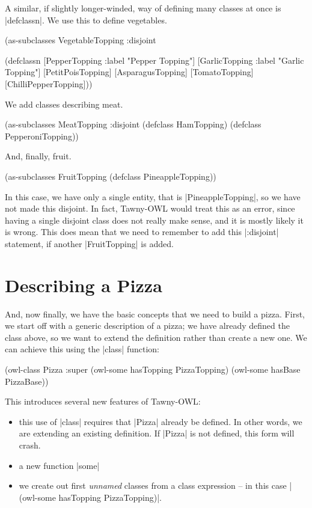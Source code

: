 A similar, if slightly longer-winded, way of defining many classes at
once is |defclassn|. We use this to define vegetables.

\begin{tawny}
(as-subclasses
 VegetableTopping
 :disjoint

 (defclassn
  [PepperTopping
    :label "Pepper Topping"]
  [GarlicTopping
    :label "Garlic Topping"]
  [PetitPoisTopping]
  [AsparagusTopping]
  [TomatoTopping]
  [ChilliPepperTopping]))
\end{tawny}

We add classes describing meat.

\begin{tawny}
(as-subclasses
 MeatTopping
 :disjoint
 (defclass HamTopping)
 (defclass PepperoniTopping))
\end{tawny}

And, finally, fruit.

\begin{tawny}
(as-subclasses
 FruitTopping
 (defclass PineappleTopping))
\end{tawny}

In this case, we have only a single entity, that is
|PineappleTopping|, so we have not made this disjoint. In fact,
Tawny-OWL would treat this as an error, since having a single disjoint
class does not really make sense, and it is mostly likely it is
wrong. This does mean that we need to remember to add this |:disjoint|
statement, if another |FruitTopping| is added.

\section{Describing a Pizza}
\label{sec:describing-pizza}

And, now finally, we have the basic concepts that we need to build a pizza.
First, we start off with a generic description of a pizza; we have already
defined the class above, so we want to extend the definition rather than
create a new one. We can achieve this using the |class| function:

\begin{tawny}
(owl-class Pizza
           :super
           (owl-some hasTopping PizzaTopping)
           (owl-some hasBase PizzaBase))
\end{tawny}

This introduces several new features of Tawny-OWL:
\begin{itemize}
\item this use of |class| requires that |Pizza| already be defined. In other
words, we are extending an existing definition. If |Pizza| is not defined,
this form will crash.
\item a new function |some|
\item we create out first \emph{unnamed} classes from a class expression -- in this
case |(owl-some hasTopping PizzaTopping)|.
\end{itemize}

